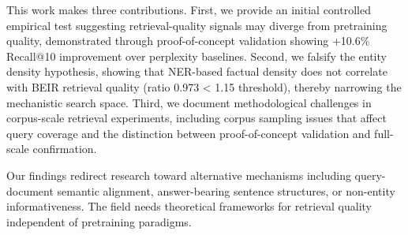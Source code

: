 This work makes three contributions. First, we provide an initial controlled empirical test suggesting retrieval-quality signals may diverge from pretraining quality, demonstrated through proof-of-concept validation showing +10.6\% Recall@10 improvement over perplexity baselines. Second, we falsify the entity density hypothesis, showing that NER-based factual density does not correlate with BEIR retrieval quality (ratio 0.973 < 1.15 threshold), thereby narrowing the mechanistic search space. Third, we document methodological challenges in corpus-scale retrieval experiments, including corpus sampling issues that affect query coverage and the distinction between proof-of-concept validation and full-scale confirmation.

Our findings redirect research toward alternative mechanisms including query-document semantic alignment, answer-bearing sentence structures, or non-entity informativeness. The field needs theoretical frameworks for retrieval quality independent of pretraining paradigms.
